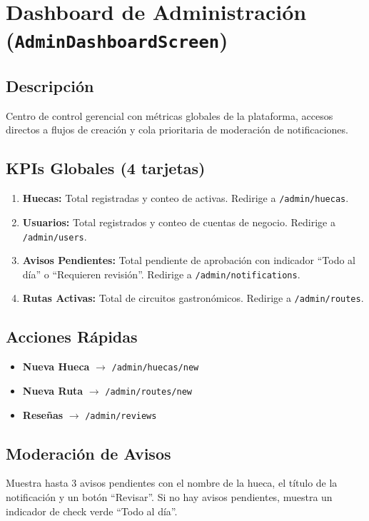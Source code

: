 \documentclass[11pt, a4paper, oneside]{report}
\begin{document}
\section{Dashboard de Administración (\texttt{AdminDashboardScreen})}

\subsection{Descripción}
Centro de control gerencial con métricas globales de la plataforma, accesos directos a flujos de creación y cola prioritaria de moderación de notificaciones.

\subsection{KPIs Globales (4 tarjetas)}
\begin{enumerate}
  \item \textbf{Huecas:} Total registradas y conteo de activas. Redirige a \texttt{/admin/huecas}.
  \item \textbf{Usuarios:} Total registrados y conteo de cuentas de negocio. Redirige a \texttt{/admin/users}.
  \item \textbf{Avisos Pendientes:} Total pendiente de aprobación con indicador ``Todo al día'' o ``Requieren revisión''. Redirige a \texttt{/admin/notifications}.
  \item \textbf{Rutas Activas:} Total de circuitos gastronómicos. Redirige a \texttt{/admin/routes}.
\end{enumerate}

\subsection{Acciones Rápidas}
\begin{itemize}
  \item \textbf{Nueva Hueca} $\rightarrow$ \texttt{/admin/huecas/new}
  \item \textbf{Nueva Ruta} $\rightarrow$ \texttt{/admin/routes/new}
  \item \textbf{Reseñas} $\rightarrow$ \texttt{/admin/reviews}
\end{itemize}

\subsection{Moderación de Avisos}
Muestra hasta 3 avisos pendientes con el nombre de la hueca, el título de la notificación y un botón ``Revisar''. Si no hay avisos pendientes, muestra un indicador de check verde ``Todo al día''.
\end{document}
